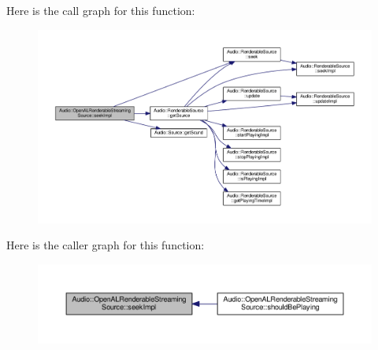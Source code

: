 Here is the call graph for this function\+:
\nopagebreak
\begin{figure}[H]
\begin{center}
\leavevmode
\includegraphics[width=350pt]{d8/dcb/classAudio_1_1OpenALRenderableStreamingSource_ad41ca876f277720b983309dc51cd17c5_cgraph}
\end{center}
\end{figure}




Here is the caller graph for this function\+:
\nopagebreak
\begin{figure}[H]
\begin{center}
\leavevmode
\includegraphics[width=350pt]{d8/dcb/classAudio_1_1OpenALRenderableStreamingSource_ad41ca876f277720b983309dc51cd17c5_icgraph}
\end{center}
\end{figure}


